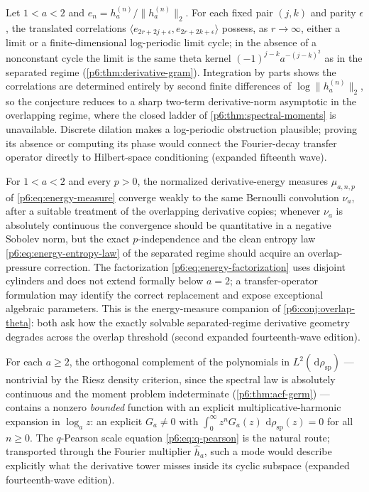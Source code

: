 \documentclass[11pt,oneside]{article}
\numberwithin{equation}{section}
\theoremstyle{definition}
\theoremstyle{remark}
\newcommand{\dd}{\,\mathrm d}
\begin{document}
\begin{conjecture}
\label{p6:conj:overlap-theta}
Let $1<a<2$ and $e_n=h_a^{(n)}/\|h_a^{(n)}\|_2$.  For each fixed pair
$(j,k)$ and parity $\epsilon$, the translated correlations
$\langle e_{2r+2j+\epsilon},e_{2r+2k+\epsilon}\rangle$ possess, as
$r\to\infty$, either a limit or a finite-dimensional log-periodic limit
cycle; in the absence of a nonconstant cycle the limit is the same theta
kernel $(-1)^{j-k}a^{-(j-k)^2}$ as in the separated regime
(\cref{p6:thm:derivative-gram}).  Integration by parts shows the
correlations are determined entirely by second finite differences of
$\log\|h_a^{(n)}\|_2$, so the conjecture reduces to a sharp two-term
derivative-norm asymptotic in the overlapping regime, where the closed
ladder of \cref{p6:thm:spectral-moments} is unavailable.  Discrete dilation
makes a log-periodic obstruction plausible; proving its absence or computing
its phase would connect the Fourier-decay transfer operator directly to
Hilbert-space conditioning (expanded fifteenth wave).
\end{conjecture}

\begin{conjecture}
\label{p6:conj:overlap-energy}
For $1<a<2$ and every $p>0$, the normalized derivative-energy measures
$\mu_{a,n,p}$ of \eqref{p6:eq:energy-measure} converge weakly to the same
Bernoulli convolution $\nu_a$, after a suitable treatment of the
overlapping derivative copies; whenever $\nu_a$ is absolutely continuous
the convergence should be quantitative in a negative Sobolev norm, but the
exact $p$-independence and the clean entropy law
\eqref{p6:eq:energy-entropy-law} of the separated regime should acquire an
overlap-pressure correction.  The factorization
\eqref{p6:eq:energy-factorization} uses disjoint cylinders and does not
extend formally below $a=2$; a transfer-operator formulation may identify
the correct replacement and expose exceptional algebraic parameters.  This
is the energy-measure companion of \cref{p6:conj:overlap-theta}: both ask
how the exactly solvable separated-regime derivative geometry degrades
across the overlap threshold (second expanded fourteenth-wave edition).
\end{conjecture}

\begin{conjecture}
\label{p6:conj:spectral-null-modes}
For each $a\ge2$, the orthogonal complement of the polynomials in
$L^2(\dd\rho_{\mathrm{sp}})$ --- nontrivial by the Riesz density criterion,
since the spectral law is absolutely continuous and the moment problem
indeterminate (\cref{p6:thm:acf-germ}) --- contains a nonzero
\emph{bounded} function with an explicit multiplicative-harmonic expansion
in $\log_az$: an explicit $G_a\ne0$ with
$\int_0^\infty z^nG_a(z)\,\dd\rho_{\mathrm{sp}}(z)=0$ for all $n\ge0$.
The $q$-Pearson scale equation \eqref{p6:eq:q-pearson} is the natural
route; transported through the Fourier multiplier $\widehat h_a$, such a
mode would describe explicitly what the derivative tower misses inside its
cyclic subspace (expanded fourteenth-wave edition).
\end{conjecture}
\end{document}
